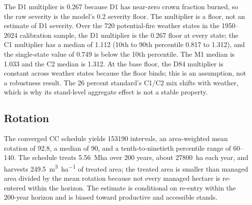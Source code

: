The D1 multiplier is 0.267 because D1 has near-zero crown fraction burned, so the raw severity is the
model's 0.2 severity floor. The multiplier is a floor, not an estimate of D1 severity. Over
the 720 potential-fire weather states in the 1950--2024 calibration sample, the D1 multiplier is the
0.267 floor at every state; the C1 multiplier has a median of 1.112 (10th to 90th percentile 0.817 to
1.312), and the single-state value of 0.749 is below the 10th percentile. The M1 median is 1.033 and
the C2 median is 1.312. At the base floor, the D84 multiplier is constant across weather states
because the floor binds; this is an assumption, not a robustness result. The 26 percent standard's C1/C2 mix shifts with weather,
which is why its stand-level aggregate effect is not a stable property.

\subsection{Rotation}

The converged CC schedule yields \num{153190} intervals, an area-weighted mean rotation of
\SI{92.8}{\year}, a median of \SI{90}{\year}, and a tenth-to-ninetieth percentile range of
\SIrange{60}{140}{\year}. The schedule treats \SI{5.56}{\mega\hectare} over 200 years, about
\SI{27800}{\hectare} each year, and harvests \SI{249.5}{\cubic\meter\per\hectare} of treated
area; the treated area is smaller than managed area divided by the mean rotation because not every
managed hectare is re-entered within the horizon. The estimate is conditional on re-entry within the
200-year horizon and is biased toward productive and accessible stands.
